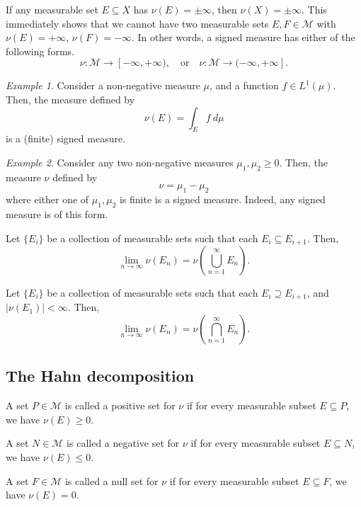 \documentclass[11pt]{article}
\newcommand{\M}{\mathcal{M}}
\theoremstyle{definition}
\theoremstyle{remark}
\newtheorem*{example}{Example}
\begin{document}
    \begin{corollary}
        If any measurable set $E\subseteq X$ has $\nu(E) = \pm\infty$, then $\nu(X) =
        \pm\infty$. This immediately shows that we cannot have two measurable sets
        $E, F \in \M$ with $\nu(E) = +\infty$, $\nu(F) = -\infty$. In other words, a
        signed measure has either of the following forms. \[
            \nu\colon \M \to [-\infty, +\infty), \quad\text{or}\quad
            \nu\colon \M \to (-\infty, +\infty].
        \]
    \end{corollary}

    \begin{example}
        Consider a non-negative measure $\mu$, and a function $f\in L^1(\mu)$. Then,
        the measure defined by \[
            \nu(E) = \int_E f\:d\mu
        \] is a (finite) signed measure.
    \end{example}
    \begin{example}
        Consider any two non-negative measures $\mu_1, \mu_2 \geq 0$. Then, the
        measure $\nu$ defined by \[
            \nu = \mu_1 - \mu_2
        \] where either one of $\mu_1, \mu_2$ is finite is a signed measure. Indeed,
        any signed measure is of this form.
    \end{example}

    \begin{lemma}
        Let $\{E_i\}$ be a collection of measurable sets such that each $E_i
        \subseteq E_{i + 1}$. Then, \[
            \lim_{n \to \infty} \nu(E_n) = \nu\left(\bigcup_{n = 1}^\infty
            E_n\right).
        \]
    \end{lemma}

    \begin{lemma}
        Let $\{E_i\}$ be a collection of measurable sets such that each $E_i
        \supseteq E_{i + 1}$, and $|\nu(E_1)| < \infty$. Then, \[
            \lim_{n \to \infty} \nu(E_n) = \nu\left(\bigcap_{n = 1}^\infty
            E_n\right).
        \]
    \end{lemma}

    \subsection{The Hahn decomposition}

    \begin{definition}
        A set $P \in \M$ is called a positive set for $\nu$ if for every measurable
        subset $E \subseteq P$, we have $\nu(E) \geq 0$.
    \end{definition}
    \begin{definition}
        A set $N \in \M$ is called a negative set for $\nu$ if for every measurable
        subset $E \subseteq N$, we have $\nu(E) \leq 0$.
    \end{definition}
    \begin{definition}
        A set $F \in \M$ is called a null set for $\nu$ if for every measurable
        subset $E \subseteq F$, we have $\nu(E) = 0$.
    \end{definition}
\end{document}

